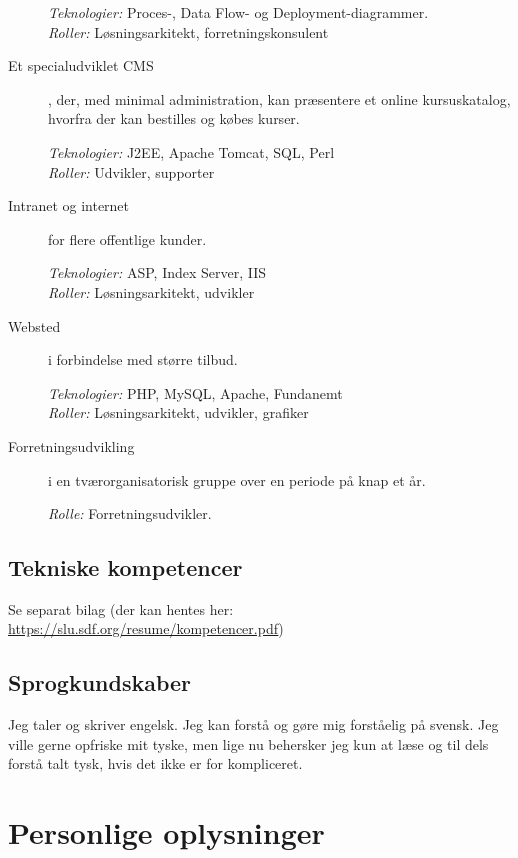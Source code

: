 \documentclass[a4paper,11pt]{article}
\begin{document}
\begin{description}
  \textit{Teknologier:} Proces-, Data Flow- og Deployment-diagrammer.\\
  \textit{Roller:} Løsningsarkitekt, forretningskonsulent

\item[Et specialudviklet CMS], der, med minimal
  administration, kan præsentere et online kursuskatalog,
  hvorfra der kan bestilles og købes kurser.

  \textit{Teknologier:} J2EE, Apache Tomcat, SQL, Perl\\
  \textit{Roller:} Udvikler, supporter

\item[Intranet og internet] for flere offentlige kunder.

  \textit{Teknologier:} ASP, Index Server, IIS\\
  \textit{Roller:} Løsningsarkitekt, udvikler

\item[Websted] i forbindelse med større tilbud.

  \textit{Teknologier:} PHP, MySQL, Apache, Fundanemt\\
  \textit{Roller:} Løsningsarkitekt, udvikler, grafiker

\item[Forretningsudvikling] i en
  tværorganisatorisk gruppe over en periode på knap et
  år.

  \textit{Rolle:} Forretningsudvikler.

\end{description}

\subsection*{Tekniske kompetencer}

Se separat bilag (der kan hentes her: \url{https://slu.sdf.org/resume/kompetencer.pdf})

\subsection*{Sprogkundskaber}

Jeg taler og skriver engelsk. Jeg kan forstå og gøre mig forståelig på
svensk. Jeg ville gerne opfriske mit tyske, men lige nu behersker jeg
kun at læse og til dels forstå talt tysk, hvis det ikke er for
kompliceret.


\section*{Personlige oplysninger}
\end{document}
